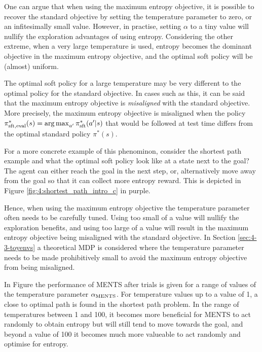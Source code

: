         One can argue that when using the maximum entropy objective, it is possible to recover the standard objective by setting the temperature parameter to zero, or an infitesimally small value.  However, in practise, setting $\alpha$ to a tiny value will nullify the exploration advantages of using entropy. Considering the other extreme, when a very large temperature is used, entropy becomes the dominant objective in the maximum entropy objective, and the optimal soft policy will be (almost) uniform. 

        The optimal soft policy for a large temperature may be very different to the optimal policy for the standard objective. In cases such as this, it can be said that the maximum entropy objective is \textit{misaligned} with the standard objective. More precisely, the maximum entropy objective is misaligned when the policy $\pi^*_{{\textnormal{sft}},\text{eval}}(s) = \operatorname*{arg\,max}_{a'} \pi^*_{{\textnormal{sft}}}(a'|s)$ that would be followed at test time differs from the optimal standard policy $\pi^*(s)$.
        
        For a more concrete example of this phenominon, consider the shortest path example and what the optimal soft policy look like at a state next to the goal? The agent can either reach the goal in the next step, or, alternatively move away from the goal so that it can collect more entropy reward. This is depicted in Figure \ref{fig:4:shortest_path_intro_c} in purple.   

        Hence, when using the maximum entropy objective the temperature parameter often needs to be carefully tuned. Using too small of a value will nullify the exploration benefits, and using too large of a value will result in the maximum entropy objective being misaligned with the standard objective. In Section \ref{sec:4-3-toyenvs} a theoretical MDP is considered where the temperature parameter needs to be made prohibitively small to avoid the maximum entropy objective from being misaligned. 

        In Figure  the performance of MENTS after  trials is given for a range of values of the temperature parameter ${\alpha_{{\textnormal{MENTS}}}}$. For temperature values up to a value of 1, a close to optimal path is found in the shortest path problem. In the range of temperatures between 1 and 100, it becomes more beneficial for MENTS to act randomly to obtain entropy but will still tend to move towards the goal, and beyond a value of 100 it becomes much more valueable to act randomly and optimise for entropy. 

